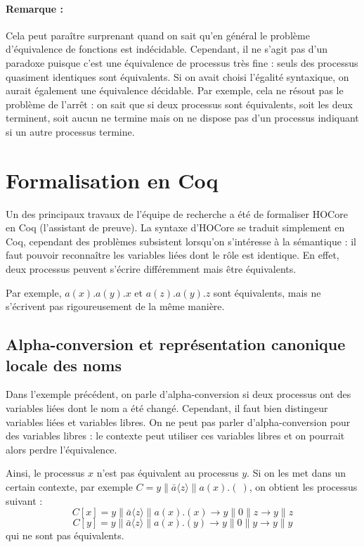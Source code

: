 \documentclass[11pt]{article}
\begin{document}

\paragraph{Remarque :} Cela peut paraître surprenant quand on sait qu'en général le problème d'équivalence de fonctions est indécidable. Cependant, il ne s'agit pas d'un paradoxe puisque c'est une équivalence de processus très fine : seuls des processus quasiment identiques sont équivalents. Si on avait choisi l'égalité syntaxique, on aurait également une équivalence décidable.  Par exemple, cela ne résout pas le problème de l'arrêt : on sait que si deux processus sont équivalents, soit les deux terminent, soit aucun ne termine mais on ne dispose pas d'un processus indiquant si un autre processus termine. 


\section{Formalisation en Coq}
Un des principaux travaux de l'équipe de recherche a été de formaliser HOCore en Coq (l'assistant de preuve).
La syntaxe d'HOCore se traduit simplement en Coq, cependant des problèmes subsistent lorsqu'on s'intéresse à la sémantique : il faut pouvoir reconnaître les variables liées dont le rôle est identique. En effet, deux processus peuvent s'écrire différemment mais être équivalents.

Par exemple, $a(x).a(y).x$ et $a(z).a(y).z$ sont équivalents, mais ne s'écrivent pas rigoureusement de la même manière.

\subsection{Alpha-conversion et représentation canonique locale des noms}
Dans l'exemple précédent, on parle d'alpha-conversion si deux processus ont des variables liées dont le nom a été changé. Cependant, il faut bien distingeur variables liées et variables libres. On ne peut pas parler d'alpha-conversion pour des variables libres : le contexte peut utiliser ces variables libres et on pourrait alors perdre l'équivalence.

Ainsi, le processus $x$ n'est pas équivalent au processus $y$. Si on les met dans un certain contexte, par exemple $C = y\|\bar{a}\langle z\rangle\|a(x).(\ )$, on obtient les processus suivant : 
$$C[x] = y\|\bar{a}\langle z\rangle\|a(x).(x) \rightarrow y\|0\|z \rightarrow y\|z$$
$$C[y] = y\|\bar{a}\langle z\rangle\|a(x).(y) \rightarrow y\|0\|y \rightarrow y\|y$$
qui ne sont pas équivalents.
\end{document}
